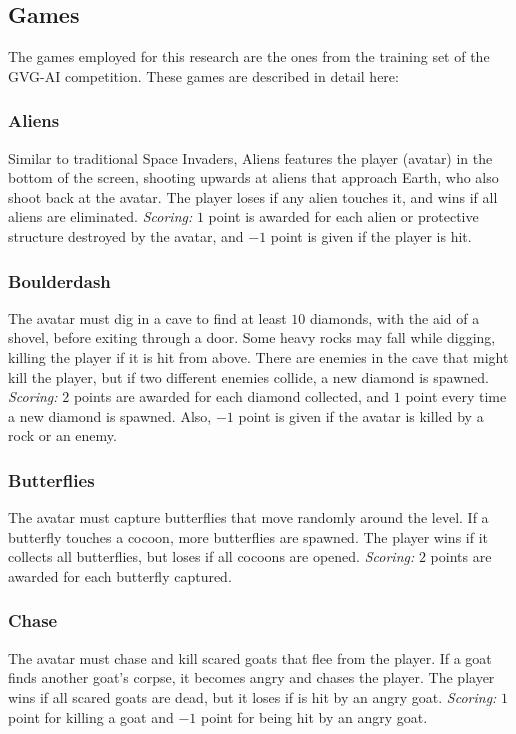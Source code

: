 \documentclass[conference]{IEEEtran}
\begin{document}
\subsection{Games} \label{ssec:games}

The games employed for this research are the ones from the training set of the GVG-AI competition. These games are described in detail here: 

\subsubsection{Aliens} Similar to traditional Space Invaders, Aliens features the player (avatar) in the bottom of the screen, shooting upwards at aliens that approach Earth, who also shoot back at the avatar. The player loses if any alien touches it, and wins if all aliens are eliminated. \textit{Scoring:} $1$ point is awarded for each alien or protective structure destroyed by the avatar, and $-1$ point is given if the player is hit. 

\subsubsection{Boulderdash} The avatar must dig in a cave to find at least $10$ diamonds, with the aid of a shovel, before exiting through a door. Some heavy rocks may fall while digging, killing the player if it is hit from above. There are enemies in the cave that might kill the player, but if two different enemies collide, a new diamond is spawned. \textit{Scoring:} $2$ points are awarded for each diamond collected, and $1$ point every time a new diamond is spawned. Also, $-1$ point is given if the avatar is killed by a rock or an enemy.

\subsubsection{Butterflies} The avatar must capture butterflies that move randomly around the level. If a butterfly touches a cocoon, more butterflies are spawned. The player wins if it collects all butterflies, but loses if all cocoons are opened. \textit{Scoring:} $2$ points are awarded for each butterfly captured. 

\subsubsection{Chase} The avatar must chase and kill scared goats that flee from the player. If a goat finds another goat's corpse, it becomes angry and chases the player. The player wins if all scared goats are dead, but it loses if is hit by an angry goat. \textit{Scoring:} $1$ point for killing a goat and $-1$ point for being hit by an angry goat.
\end{document}
